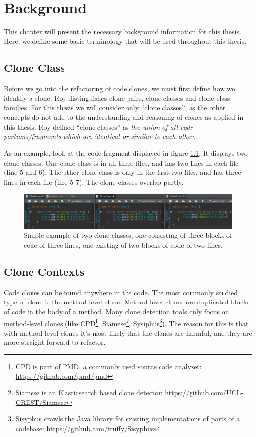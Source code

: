 \chapter{Background}
\label{ch:background}
This chapter will present the necessary background information for this thesis. Here, we define some basic terminology that will be used throughout this thesis.

\section{Clone Class}
Before we go into the refactoring of code clones, we must first define how we identify a clone. Roy \cite{roy2007survey} distinguishes clone pairs, clone classes and clone class families. For this thesis we will consider only ``clone classes'', as the other concepts do not add to the understanding and reasoning of clones as applied in this thesis. Roy defined ``clone classes'' as \textit{the union of all code portions/fragments which are identical or similar to each other}.

As an example, look at the code fragment displayed in figure \ref{fig:cloneclass}. It displays two clone classes. One clone class is in all three files, and has two lines in each file (line 5 and 6). The other clone class is only in the first two files, and has three lines in each file (line 5-7). The clone classes overlap partly.
\begin{figure}[H]
	\includegraphics[width=1\textwidth]{img/clone-class}
	\caption{Simple example of two clone classes, one consisting of three blocks of code of three lines, one existing of two blocks of code of two lines.}
	\label{fig:cloneclass}
\end{figure}

\section{Clone Contexts}
Code clones can be found anywhere in the code. The most commonly studied type of clone is the method-level clone. Method-level clones are duplicated blocks of code in the body of a method. Many clone detection tools only focus on method-level clones (like CPD\footnote{CPD is part of PMD, a commonly used source code analyzer: \url{https://github.com/pmd/pmd}}, Siamese\footnote{Siamese is an Elasticsearch based clone detector: \url{https://github.com/UCL-CREST/Siamese}}, Sysiphus\footnote{Sisyphus crawls the Java library for existing implementations of parts of a codebase: \url{https://github.com/fruffy/Sisyphus}}). The reason for this is that with method-level clones it's most likely that the clones are harmful, and they are more straight-forward to refactor.

